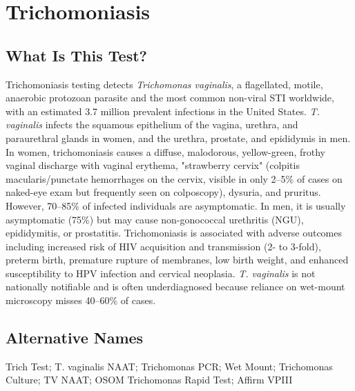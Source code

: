 \chapter{Trichomoniasis}

\section*{What Is This Test?}
Trichomoniasis testing detects \textit{Trichomonas vaginalis}, a flagellated, motile, anaerobic protozoan parasite and the most common non-viral STI worldwide, with an estimated 3.7 million prevalent infections in the United States. \textit{T. vaginalis} infects the squamous epithelium of the vagina, urethra, and paraurethral glands in women, and the urethra, prostate, and epididymis in men. In women, trichomoniasis causes a diffuse, malodorous, yellow-green, frothy vaginal discharge with vaginal erythema, "strawberry cervix" (colpitis macularis/punctate hemorrhages on the cervix, visible in only 2--5\% of cases on naked-eye exam but frequently seen on colposcopy), dysuria, and pruritus. However, 70--85\% of infected individuals are asymptomatic. In men, it is usually asymptomatic (75\%) but may cause non-gonococcal urethritis (NGU), epididymitis, or prostatitis. Trichomoniasis is associated with adverse outcomes including increased risk of HIV acquisition and transmission (2- to 3-fold), preterm birth, premature rupture of membranes, low birth weight, and enhanced susceptibility to HPV infection and cervical neoplasia. \textit{T. vaginalis} is not nationally notifiable and is often underdiagnosed because reliance on wet-mount microscopy misses 40--60\% of cases.

\section*{Alternative Names}
Trich Test; T. vaginalis NAAT; Trichomonas PCR; Wet Mount; Trichomonas Culture; TV NAAT; OSOM Trichomonas Rapid Test; Affirm VPIII

